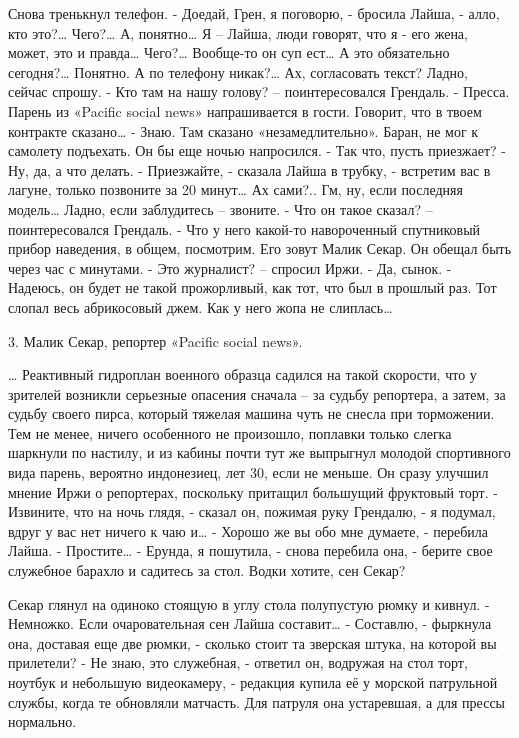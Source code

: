 \documentclass{book}
\begin{document}
Снова тренькнул телефон.
- Доедай, Грен, я поговорю, - бросила Лайша, - алло, кто это?\ldots{} Чего?\ldots{} А, понятно\ldots{} Я -- Лайша, люди говорят, что я - его жена, может, это и правда\ldots{} Чего?\ldots{} Вообще-то он суп ест\ldots{} А это обязательно сегодня?\ldots{} Понятно. А по телефону никак?\ldots{} Ах, согласовать текст? Ладно, сейчас спрошу.
- Кто там на нашу голову? -- поинтересовался Грендаль.
- Пресса. Парень из «Pacific social news» напрашивается в гости. Говорит, что в твоем контракте сказано\ldots{}
- Знаю. Там сказано «незамедлительно». Баран, не мог к самолету подъехать. Он бы еще ночью напросился.
- Так что, пусть приезжает?
- Ну, да, а что делать.
- Приезжайте, - сказала Лайша в трубку, - встретим вас в лагуне, только позвоните за 20 минут\ldots{} Ах сами?.. Гм, ну, если последняя модель\ldots{} Ладно, если заблудитесь -- звоните.
- Что он такое сказал? -- поинтересовался Грендаль.
- Что у него какой-то навороченный спутниковый прибор наведения, в общем, посмотрим. Его зовут Малик Секар. Он обещал быть через час с минутами.
- Это журналист? -- спросил Иржи.
- Да, сынок.
- Надеюсь, он будет не такой прожорливый, как тот, что был в прошлый раз. Тот слопал весь абрикосовый джем. Как у него жопа не слиплась\ldots{}



3. Малик Секар, репортер «Pacific social news».


\ldots{} Реактивный гидроплан военного образца садился на такой скорости, что у зрителей возникли серьезные опасения сначала -- за судьбу репортера, а затем, за судьбу своего пирса, который тяжелая машина чуть не снесла при торможении. Тем не менее, ничего особенного не произошло, поплавки только слегка шаркнули по настилу, и из кабины почти тут же выпрыгнул молодой спортивного вида парень, вероятно индонезиец, лет 30, если не меньше. Он сразу улучшил мнение Иржи о репортерах, поскольку притащил большущий фруктовый торт.
- Извините, что на ночь глядя, - сказал он, пожимая руку Грендалю, - я подумал, вдруг у вас нет ничего к чаю и\ldots{}
- Хорошо же вы обо мне думаете, - перебила Лайша.
- Простите\ldots{}
- Ерунда, я пошутила, - снова перебила она, - берите свое служебное барахло и садитесь за стол. Водки хотите, сен Секар?

Секар глянул на одиноко стоящую в углу стола полупустую рюмку и кивнул.
- Немножко. Если очаровательная сен Лайша составит\ldots{}
- Составлю, - фыркнула она, доставая еще две рюмки, - сколько стоит та зверская штука, на которой вы прилетели?
- Не знаю, это служебная, - ответил он, водружая на стол торт, ноутбук и небольшую видеокамеру, - редакция купила её у морской патрульной службы, когда те обновляли матчасть. Для патруля она устаревшая, а для прессы нормально.
\end{document}
